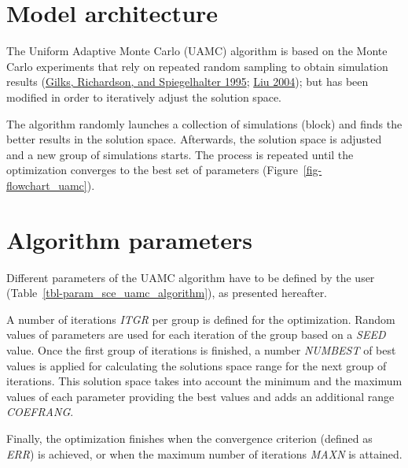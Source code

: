 \documentclass[
  letterpaper,
  DIV=11,
  numbers=noendperiod]{scrreprt}
\begin{document}
\hypertarget{model-architecture-1}{%
\section{Model architecture}\label{model-architecture-1}}

The Uniform Adaptive Monte Carlo (UAMC) algorithm is based on the Monte
Carlo experiments that rely on repeated random sampling to obtain
simulation results (\protect\hyperlink{ref-gilks_markov_1995}{Gilks,
Richardson, and Spiegelhalter 1995};
\protect\hyperlink{ref-liu_monte_2004}{Liu 2004}); but has been modified
in order to iteratively adjust the solution space.

The algorithm randomly launches a collection of simulations (block) and
finds the better results in the solution space. Afterwards, the solution
space is adjusted and a new group of simulations starts. The process is
repeated until the optimization converges to the best set of parameters
(Figure~\ref{fig-flowchart_uamc}).

\hypertarget{algorithm-parameters-1}{%
\section{Algorithm parameters}\label{algorithm-parameters-1}}

Different parameters of the UAMC algorithm have to be defined by the
user (Table~\ref{tbl-param_sce_uamc_algorithm}), as presented hereafter.

A number of iterations \emph{ITGR} per group is defined for the
optimization. Random values of parameters are used for each iteration of
the group based on a \emph{SEED} value. Once the first group of
iterations is finished, a number \emph{NUMBEST} of best values is
applied for calculating the solutions space range for the next group of
iterations. This solution space takes into account the minimum and the
maximum values of each parameter providing the best values and adds an
additional range \emph{COEFRANG}.

Finally, the optimization finishes when the convergence criterion
(defined as \emph{ERR}) is achieved, or when the maximum number of
iterations \emph{MAXN} is attained.
\end{document}
